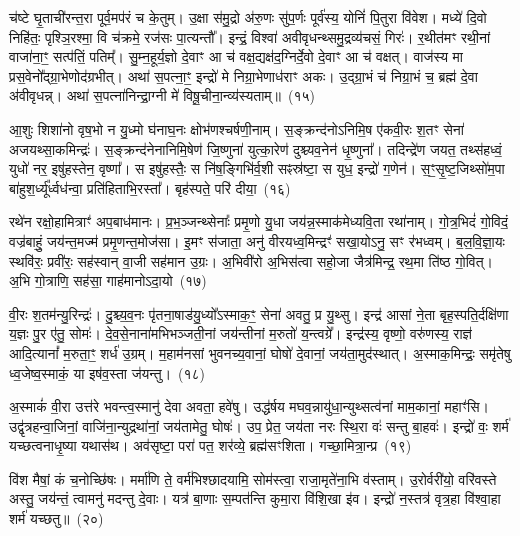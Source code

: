 च॑ष्टे घृ॒ताची॑रन्त॒रा पूर्व॒मप॑रं च के॒तुम्। उ॒क्षा स॑मु॒द्रो अ॑रु॒णः सु॑प॒र्णः पूर्व॑स्य॒ योनिं॑ पि॒तुरा वि॑वेश। मध्ये॑ दि॒वो निहि॑तः॒ पृश्ञि॒रश्मा॒ वि च॑क्रमे॒ रज॑सः पा॒त्यन्तौ᳚। इन्द्रं॒ विश्वा॑ अवीवृधन्थ्समु॒द्रव्य॑चसं॒ गिरः॑। र॒थीत॑मꣳ रथी॒नां वाजा॑ना॒ꣳ॒ सत्प॑तिं॒ पतिम्᳚। सु॒म्न॒हूर्य॒ज्ञो दे॒वाꣳ आ च॑ वक्ष॒द्यक्ष॑द॒ग्निर्दे॒वो दे॒वाꣳ आ च॑ वक्षत्। वाज॑स्य मा प्रस॒वेनो᳚द्ग्रा॒भेणोद॑ग्रभीत्। अथा॑ स॒पत्ना॒ꣳ॒ इन्द्रो॑ मे निग्रा॒भेणाध॑राꣳ अकः। उ॒द्ग्रा॒भं च॑ निग्रा॒भं च॒ ब्रह्म॑ दे॒वा अ॑वीवृधन्न्। अथा॑ स॒पत्ना॑निन्द्रा॒ग्नी मे॑ विषू॒चीना॒न्व्य॑स्यताम्॥~(१५)\ip

{\anuvakamend[{दे॒वाः श॒तप॑या अ॒भि वाज॑स्य॒ षड्विꣳ॑शतिश्च}]}

आ॒शुः शिशा॑नो वृष॒भो न यु॒ध्मो घ॑नाघ॒नः क्षोभ॑णश्चर्\mbox{}षणी॒नाम्। स॒ङ्क्रन्द॑नो\-ऽनिमि॒ष ए॑कवी॒रः श॒तꣳ सेना॑ अजयथ्सा॒कमिन्द्रः॑। स॒ङ्क्रन्द॑नेनानिमि॒षेण॑ जि॒ष्णुना॑ युत्का॒रेण॑ दुश्च्यव॒नेन॑ धृ॒ष्णुना᳚। तदिन्द्रे॑ण जयत॒ तथ्स॑हध्वं॒ युधो॑ नर॒ इषु॑हस्तेन॒ वृष्णा᳚। स इषु॑हस्तैः॒ स नि॑ष॒ङ्गिभि॑र्व॒शी सꣴस्र॑ष्टा॒ स युध॒ इन्द्रो॑ ग॒णेन॑। स॒ꣳ॒सृ॒ष्ट॒जिथ्सो॑म॒पा बा॑हुश॒र्ध्यू᳚र्ध्वध॑न्वा॒ प्रति॑हिताभि॒रस्ता᳚। बृह॑स्पते॒ परि॑ दीया॒~(१६)\ip

रथे॑न रक्षो॒हामित्राꣳ॑ अप॒बाध॑मानः। प्र॒भ॒ञ्जन्थ्सेनाः᳚ प्रमृ॒णो यु॒धा जय॑न्न॒स्माक॑मेध्यवि॒ता रथा॑नाम्। गो॒त्र॒भिदं॑ गो॒विदं॒ वज्र॑बाहुं॒ जय॑न्त॒मज्म॑ प्रमृ॒णन्त॒मोज॑सा। इ॒मꣳ स॑जाता॒ अनु॑ वीरयध्व॒मिन्द्रꣳ॑ सखा॒यो\-ऽनु॒ सꣳ र॑भध्वम्। ब॒ल॒वि॒ज्ञा॒यः स्थवि॑रः॒ प्रवी॑रः॒ सह॑स्वान् वा॒जी सह॑मान उ॒ग्रः। अ॒भिवी॑रो अ॒भिस॑त्वा सहो॒जा जैत्र॑मिन्द्र॒ रथ॒मा ति॑ष्ठ गो॒वित्। अ॒भि गो॒त्राणि॒ सह॑सा॒ गाह॑मानो\-ऽदा॒यो~(१७)\ip

वी॒रः श॒तम॑न्यु॒रिन्द्रः॑। दु॒श्च्य॒व॒नः पृ॑तना॒षाड॑यु॒ध्यो᳚\-ऽस्माक॒ꣳ॒ सेना॑ अवतु॒ प्र यु॒थ्सु। इन्द्र॑ आसां ने॒ता बृह॒स्पति॒र्दक्षि॑णा य॒ज्ञः पु॒र ए॑तु॒ सोमः॑। दे॒व॒से॒नाना॑मभिभञ्जती॒नां जय॑न्तीनां म॒रुतो॑ य॒न्त्वग्रे᳚। इन्द्र॑स्य॒ वृष्णो॒ वरु॑णस्य॒ राज्ञ॑ आदि॒त्यानां᳚ म॒रुता॒ꣳ॒ शर्ध॑ उ॒ग्रम्। म॒हाम॑नसां भुवनच्य॒वानां॒ घोषो॑ दे॒वानां॒ जय॑ता॒मुद॑स्थात्। अ॒स्माक॒मिन्द्रः॒ समृ॑तेषु ध्व॒जेष्व॒स्माकं॒ या इष॑व॒स्ता ज॑यन्तु।~(१८)\ip

अ॒स्माकं॑ वी॒रा उत्त॑रे भवन्त्व॒स्मानु॑ देवा अवता॒ हवे॑षु। उद्ध॑र्\mbox{}षय मघव॒न्नायु॑धा॒न्युथ्सत्व॑नां माम॒कानां॒ महाꣳ॑सि। उद्वृ॑त्रहन्वा॒जिनां॒ वाजि॑ना॒न्युद्रथा॑नां॒ जय॑तामेतु॒ घोषः॑। उप॒ प्रेत॒ जय॑ता नरः स्थि॒रा वः॑ सन्तु बा॒हवः॑। इन्द्रो॑ वः॒ शर्म॑ यच्छत्वनाधृ॒ष्या यथास॑थ। अव॑सृष्टा॒ परा॑ पत॒ शर॑व्ये॒ ब्रह्म॑सꣳशिता। गच्छा॒मित्रा॒न्प्र~(१९)\ip

वि॑श मैषां॒ कं च॒नोच्छि॑षः। मर्मा॑णि ते॒ वर्म॑भिश्छादयामि॒ सोम॑स्त्वा॒ राजा॒मृते॑ना॒भि व॑स्ताम्। उ॒रोर्वरी॑यो॒ वरि॑वस्ते अस्तु॒ जय॑न्तं॒ त्वामनु॑ मदन्तु दे॒वाः। यत्र॑ बा॒णाः स॒म्पत॑न्ति कुमा॒रा वि॑शि॒खा इ॑व। इन्द्रो॑ न॒स्तत्र॑ वृत्र॒हा वि॑श्वा॒हा शर्म॑ यच्छतु॥~(२०)\ip

